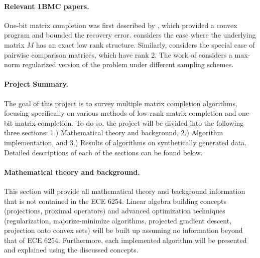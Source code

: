 \paragraph{\textbf{Relevant 1BMC papers.}} One-bit matrix completion was first described by \cite{davenport20141}, which provided a convex program and bounded the recovery error. \cite{7086879} considers the case where the underlying matrix $M$ has an exact low rank structure. Similarly, \cite{mm-spars-2013} considers the special case of pairwise comparison matrices, which have rank 2. The work of \cite{cai2013max} considers a max-norm regularized version of the problem under different sampling schemes. 

\paragraph{\textbf{Project Summary.}} The goal of this project is to survey multiple matrix completion algorithms, focusing specifically on various methods of low-rank matrix completion and one-bit matrix completion. To do so, the project will be divided into the following three sections: 1.) Mathematical theory and background, 2.) Algorithm implementation, and 3.) Results of algorithms on synthetically generated data. Detailed descriptions of each of the sections can be found below.

\paragraph{\textbf{Mathematical theory and background.}} This section will provide all mathematical theory and background information that is not contained in the ECE 6254. Linear algebra building concepts (projections, proximal operators) and advanced optimization techniques (regularization, majorize-minimize algorithms, projected gradient descent, projection onto convex sets) will be built up assuming no information beyond that of ECE 6254. Furthermore, each implemented algorithm will be presented and explained using the discussed concepts. 

